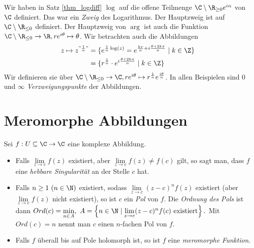 		\begin{rem}
			Wir haben in Satz \ref{thm_logdiff} $\log$ auf die offene Teilmenge $ \C \setminus \R_{\geq 0} e^{i\alpha} $ von $\C$ definiert. Das war ein \emph{Zweig} des Logarithmus. Der Hauptzweig ist auf $\C \setminus \R_{\leq 0}$ definiert. Der Hauptzweig von $\arg$ ist auch die Funktion $ \C \setminus \R_{\leq 0} \to \R, re^{i\theta} \mapsto \theta $. Wir betrachten auch die Abbildungen
			\begin{align*}
				z \mapsto z^{"\frac{1}{n}"} &= \{ e^{\frac{1}{n}\log(z)} = e^{\frac{hr}{n} + i \frac{\theta + 2k\pi}{n}} \mid k \in \Z \}\\
				&= \{ r^\frac{1}{n} \cdot e^{i \frac{\theta + 2k\pi}{n}} \mid k \in \Z \}
			\end{align*}
			Wir definieren sie über $ \C \setminus \R_{\leq 0} \to \C, re^{i\theta} \mapsto r^\frac{1}{n} e^\frac{i\theta}{n} $. In allen Beispielen sind 0 und $\infty$ \emph{Verzweigungspunkte} der Abbildungen.
		\end{rem}
	
	
	\section{Meromorphe Abbildungen}
		
		\begin{defn}
			Sei $ f : U \subseteq \C \to \C $ eine komplexe Abbildung.
			\begin{itemize}
				\item Falls $ \lim\limits_{z \to c} f(z) $ existiert, aber $ \lim\limits_{z \to c} f(z) \neq f(c) $ gilt, so sagt man, dass $f$ eine \emph{hebbare Singularität} an der Stelle $c$ hat. 
				\item Falls $ n \geq 1\ (n \in \N) $ existiert, sodass $ \lim\limits_{z \to c} (z-c)^n f(z) $ existiert (aber $ \lim\limits_{z \to c} f(z) $ nicht existiert), so ist $c$ ein \emph{Pol} von $f$. Die \emph{Ordnung des Pols} ist dann $ Ord(c) = \min\limits_{n \in A},\ A = \left\{ n \in \N \mid \lim\limits_{z \to c}(z-c)^nf(c)\ \text{existiert} \right\}. $ Mit $ Ord(c) = n $ nennt man $c$ einen $n$-fachen Pol von $f$.
				\item Falls $ f $ überall bis auf Pole holomorph ist, so ist $f$ eine \emph{meromorphe Funktion}.
			\end{itemize}
		\end{defn}